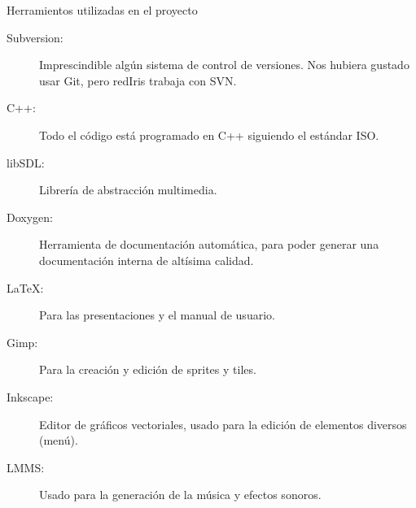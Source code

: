 \documentclass[9pt,xcolor=svgnames]{beamer}
\begin{document}
 \begin{frame}{Herramientos utilizadas en el proyecto}
   \transdissolve
   \begin{description}
   \item[Subversion: ] Imprescindible algún sistema de control de versiones.
     Nos hubiera gustado usar Git, pero redIris trabaja con SVN.
   \item[C++: ] Todo el código está programado en C++ siguiendo el estándar ISO.
   \item[libSDL: ] Librería de abstracción multimedia.
   \item[Doxygen: ] Herramienta de documentación automática, para poder 
     generar una documentación interna de altísima calidad.
   \item[\LaTeX : ] Para las presentaciones y el manual de usuario.
   \item[Gimp: ] Para la creación y edición de sprites y tiles.
   \item[Inkscape: ] Editor de gráficos vectoriales, usado para la
	      edición de elementos diversos (menú).
   \item[LMMS: ] Usado para la generación de la música y efectos sonoros.
   \end{description}
 \end{frame}
 
  

  
\end{document}
